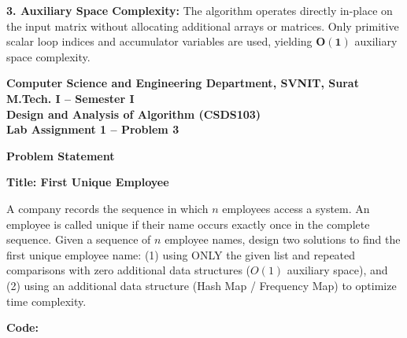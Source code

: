 \documentclass[12pt]{article}
\begin{document}
\textbf{3. Auxiliary Space Complexity:}
The algorithm operates directly in-place on the input matrix without allocating additional arrays or matrices. Only primitive scalar loop indices and accumulator variables are used, yielding $\mathbf{O(1)}$ auxiliary space complexity.

\newpage


\begin{center}
\textbf{Computer Science and Engineering Department, SVNIT, Surat}\\
\textbf{M.Tech. I -- Semester I}\\
\textbf{Design and Analysis of Algorithm (CSDS103)}\\
\textbf{Lab Assignment 1 -- Problem 3}
\end{center}

\vspace{0.4cm}

\textbf{Problem Statement}

\textbf{Title: First Unique Employee}

A company records the sequence in which $n$ employees access a system. An employee is called unique if their name occurs exactly once in the complete sequence. Given a sequence of $n$ employee names, design two solutions to find the first unique employee name: (1) using ONLY the given list and repeated comparisons with zero additional data structures ($O(1)$ auxiliary space), and (2) using an additional data structure (Hash Map / Frequency Map) to optimize time complexity.

\vspace{0.3cm}

\textbf{Code:}
\end{document}
